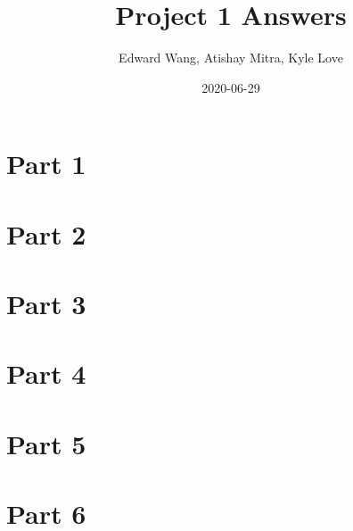 \documentclass{article}
\title{Project 1 Answers}
\date{2020-06-29}
\author{Edward Wang, Atishay Mitra, Kyle Love}
\begin{document}
\maketitle

\section{Part 1}

\section{Part 2}

\section{Part 3}

\section{Part 4}

\section{Part 5}

\section{Part 6}
\end{document}
